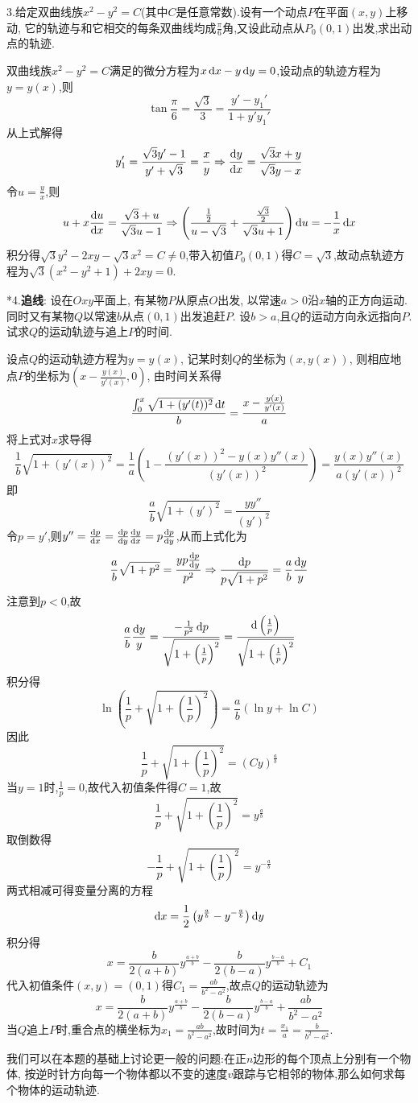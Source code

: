 3.给定双曲线族$x^2-y^2=C$(其中$C$是任意常数).设有一个动点$P$在平面$(x,y)$上移动,
它的轨迹与和它相交的每条双曲线均成$\frac{\pi}{6}$角,又设此动点从$P_0(0,1)$出发,求出动点的轨迹.

\begin{solve}
双曲线族$x^2-y^2=C$满足的微分方程为$x\mathop{}\!\mathrm{d} x-y\mathop{}\!\mathrm{d} y=0$,设动点的轨迹方程为$y=y(x)$,则
\[\tan\frac{\pi}{6}=\frac{\sqrt{3}}{3}=\frac{y'-y_1'}{1+y'y_1'}\]
从上式解得
\[y_1'=\frac{\sqrt{3}y'-1}{y'+\sqrt{3}}=\frac{x}{y}\Rightarrow\frac{\mathop{}\!\mathrm{d} y}{\mathop{}\!\mathrm{d} x}=\frac{\sqrt{3}x+y}{\sqrt{3}y-x}\]
令$u=\frac{y}{x}$,则
\[u+x\frac{\mathop{}\!\mathrm{d} u}{\mathop{}\!\mathrm{d} x}=\frac{\sqrt{3}+u}{\sqrt{3}u-1}\Rightarrow\left(\frac{\frac{1}{2}}{u-\sqrt{3}}+\frac{\frac{\sqrt{3}}{2}}{\sqrt{3}u+1}\right)\mathop{}\!\mathrm{d} u=-\frac{1}{x}\mathop{}\!\mathrm{d} x\]
积分得$\sqrt{3}y^2-2xy-\sqrt{3}x^2=C\neq0$,带入初值$P_0(0,1)$得$C=\sqrt{3}$,故动点轨迹方程为$\sqrt{3}(x^2-y^2+1)+2xy=0$.
\end{solve}


*4.\textbf{追线}: 设在$Oxy$平面上, 有某物$P$从原点$O$出发, 以常速$a>0$沿$x$轴的正方向运动. 
同时又有某物$Q$以常速$b$从点$(0,1)$出发追赶$P$. 设$b>a$,且$Q$的运动方向永远指向$P$. 试求$Q$的运动轨迹与追上$P$的时间.

\begin{solve}
设点$Q$的运动轨迹方程为$y=y(x)$, 记某时刻$Q$的坐标为$(x,y(x))$, 则相应地点$P$的坐标为$\left(x-\frac{y(x)}{y'(x)},0\right)$, 由时间关系得
\[\frac{\int_0^x\sqrt{1+(y'(t))^2}\mathop{}\!\mathrm{d} t}{b}=\frac{x-\frac{y(x)}{y'(x)}}{a}\]
将上式对$x$求导得
\[\frac{1}{b}\sqrt{1+(y'(x))^2}=\frac{1}{a}\left(1-\frac{(y'(x))^2-y(x)y''(x)}{(y'(x))^2}\right)=\frac{y(x)y''(x)}{a(y'(x))^2}\]
即\[\frac{a}{b}\sqrt{1+(y')^2}=\frac{yy''}{(y')^2}\]
令$p=y'$,则$y''=\frac{\diff p}{\diff x}=\frac{\diff p}{\diff y}\frac{\diff y}{\diff x}=p\frac{\diff p}{\diff y}$,从而上式化为
\[\frac{a}{b}\sqrt{1+p^2}=\frac{yp\frac{\mathop{}\!\mathrm{d} p}{\mathop{}\!\mathrm{d} y}}{p^2}\Rightarrow\frac{\mathop{}\!\mathrm{d} p}{p\sqrt{1+p^2}}=\frac{a}{b}\frac{\mathop{}\!\mathrm{d} y}{y}\]
注意到$p<0$,故
\[\frac{a}{b}\frac{\mathop{}\!\mathrm{d} y}{y}=\frac{-\frac{1}{p^2}\mathop{}\!\mathrm{d} p}{\sqrt{1+\left(\frac{1}{p}\right)^2}}=\frac{\mathop{}\!\mathrm{d}\left(\frac{1}{p}\right)}{\sqrt{1+\left(\frac{1}{p}\right)^2}}\]
积分得
\[\ln\left(\frac{1}{p}+\sqrt{1+\left(\frac{1}{p}\right)^2}\right)=\frac{a}{b}(\ln y+\ln C)\]
因此\[\frac{1}{p}+\sqrt{1+\left(\frac{1}{p}\right)^2}=(Cy)^{\frac{a}{b}}\]
当$y=1$时,$\frac{1}{p}=0$,故代入初值条件得$C=1$,故
\[\frac{1}{p}+\sqrt{1+\left(\frac{1}{p}\right)^2}=y^{\frac{a}{b}}\]
取倒数得
\[-\frac{1}{p}+\sqrt{1+\left(\frac{1}{p}\right)^2}=y^{-\frac{a}{b}}\]
两式相减可得变量分离的方程
\[\mathop{}\!\mathrm{d} x=\frac{1}{2}\left(y^{\frac{a}{b}}-y^{-\frac{a}{b}}\right)\mathop{}\!\mathrm{d} y\]
积分得
\[x=\frac{b}{2(a+b)}y^{\frac{a+b}{b}}-\frac{b}{2(b-a)}y^{\frac{b-a}{b}}+C_1\]
代入初值条件$(x,y)=(0,1)$得$C_1=\frac{ab}{b^2-a^2}$,故点$Q$的运动轨迹为
\[x=\frac{b}{2(a+b)}y^{\frac{a+b}{b}}-\frac{b}{2(b-a)}y^{\frac{b-a}{b}}+\frac{ab}{b^2-a^2}\]
当$Q$追上$P$时,重合点的横坐标为$x_1=\frac{ab}{b^2-a^2}$,故时间为$t=\frac{x_1}{a}=\frac{b}{b^2-a^2}$.
\end{solve}
我们可以在本题的基础上讨论更一般的问题:在正$n$边形的每个顶点上分别有一个物体,
按逆时针方向每一个物体都以不变的速度$v$跟踪与它相邻的物体,那么如何求每个物体的运动轨迹.

